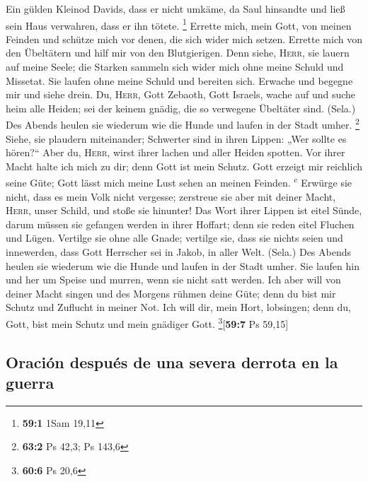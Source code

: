  Ein gülden Kleinod Davids, dass er nicht umkäme, da Saul
hinsandte und ließ sein Haus verwahren, dass er ihn tötete. \footnote{\textbf{59:1}
  1Sam 19,11}  Errette mich, mein Gott, von meinen Feinden
und schütze mich vor denen, die sich wider mich setzen. 
Errette mich von den Übeltätern und hilf mir von den Blutgierigen.
 Denn siehe, \textsc{Herr}, sie lauern auf meine Seele;
die Starken sammeln sich wider mich ohne meine Schuld und Missetat.
 Sie laufen ohne meine Schuld und bereiten sich. Erwache
und begegne mir und siehe drein.  Du, \textsc{Herr}, Gott
Zebaoth, Gott Israels, wache auf und suche heim alle Heiden; sei der
keinem gnädig, die so verwegene Übeltäter sind. (Sela.) 
Des Abends heulen sie wiederum wie die Hunde und laufen in der Stadt
umher. \footnote{\textbf{63:2} Ps 42,3; Ps 143,6}  Siehe,
sie plaudern miteinander; Schwerter sind in ihren Lippen: „Wer sollte es
hören?{}``  Aber du, \textsc{Herr}, wirst ihrer lachen und
aller Heiden spotten.  Vor ihrer Macht halte ich mich zu
dir; denn Gott ist mein Schutz.  Gott erzeigt mir
reichlich seine Güte; Gott lässt mich meine Lust sehen an meinen
Feinden. \textsuperscript{c}  Erwürge sie nicht, dass es
mein Volk nicht vergesse; zerstreue sie aber mit deiner Macht,
\textsc{Herr}, unser Schild, und stoße sie hinunter!  Das
Wort ihrer Lippen ist eitel Sünde, darum müssen sie gefangen werden in
ihrer Hoffart; denn sie reden eitel Fluchen und Lügen. 
Vertilge sie ohne alle Gnade; vertilge sie, dass sie nichts seien und
innewerden, dass Gott Herrscher sei in Jakob, in aller Welt. (Sela.)
 Des Abends heulen sie wiederum wie die Hunde und laufen
in der Stadt umher.  Sie laufen hin und her um Speise und
murren, wenn sie nicht satt werden.  Ich aber will von
deiner Macht singen und des Morgens rühmen deine Güte; denn du bist mir
Schutz und Zuflucht in meiner Not.  Ich will dir, mein
Hort, lobsingen; denn du, Gott, bist mein Schutz und mein gnädiger Gott.
\footnote{\textbf{60:6} Ps 20,6}{[}\textbf{59:7} Ps 59,15{]}

\hypertarget{oraciuxf3n-despuuxe9s-de-una-severa-derrota-en-la-guerra}{%
\subsection{Oración después de una severa derrota en la
guerra}\label{oraciuxf3n-despuuxe9s-de-una-severa-derrota-en-la-guerra}}

